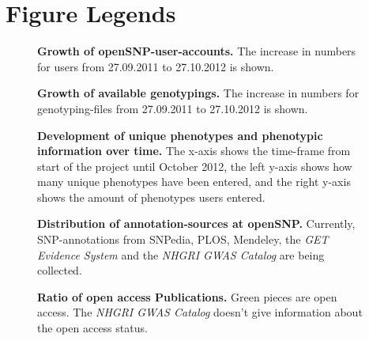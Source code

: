 \documentclass[10pt]{article}
\begin{document}
\section*{Figure Legends}
\begin{figure}[!ht]
	\caption{
	{\bf Growth of openSNP-user-accounts.} The increase in numbers for users from 27.09.2011 to 27.10.2012 is shown.} 
	\label{Figure1_label}
\end{figure}
\begin{figure}[!ht]
	\caption{
	{\bf Growth of available genotypings.} The increase in numbers for genotyping-files from 27.09.2011 to 27.10.2012 is shown.} 
	\label{Figure2_label}
\end{figure}
\begin{figure}[!ht]
	\caption{
	{\bf Development of unique phenotypes and phenotypic information over time.} The x-axis shows the time-frame from start of the project until October 2012, the left y-axis shows how many unique phenotypes have been entered, and the right y-axis shows the amount of phenotypes users entered.}
	\label{pheno}
\end{figure}

\begin{figure}[!ht]
	\caption{
	{\bf Distribution of annotation-sources at openSNP.} Currently, SNP-annotations from SNPedia, PLOS, Mendeley, the \emph{GET Evidence System} and the \emph{NHGRI GWAS Catalog} are being collected.}
	\label{Figure3_label}
\end{figure}

\begin{figure}[!ht]
	\caption{
	{\bf Ratio of open access Publications.} Green pieces are open access. The \emph{NHGRI GWAS Catalog} doesn't give information about the open access status.}
	\label{oa_label}
\end{figure}
\end{document}
